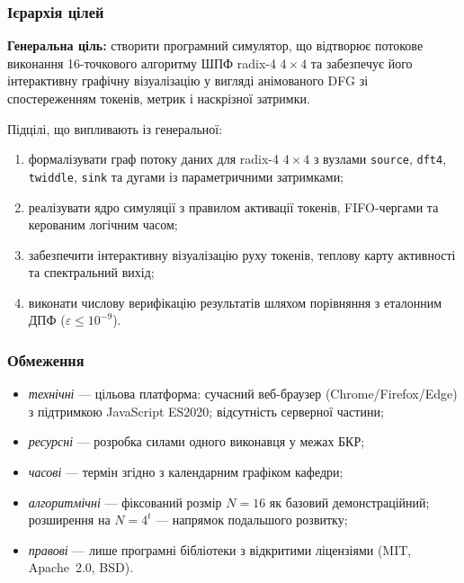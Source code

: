 \documentclass[14pt,a4paper]{extarticle}
\begin{document}
\subsubsection*{Ієрархія цілей}

\textbf{Генеральна ціль:} створити програмний симулятор, що відтворює
потокове виконання 16-точкового алгоритму ШПФ radix-4 $4\times4$ та
забезпечує його інтерактивну графічну візуалізацію у вигляді
анімованого DFG зі спостереженням токенів, метрик і наскрізної
затримки.

Підцілі, що випливають із генеральної:
\begin{enumerate}
  \item формалізувати граф потоку даних для radix-4 $4\times4$ з
        вузлами \texttt{source}, \texttt{dft4}, \texttt{twiddle},
        \texttt{sink} та дугами із параметричними затримками;
  \item реалізувати ядро симуляції з правилом активації токенів,
        FIFO-чергами та керованим логічним часом;
  \item забезпечити інтерактивну візуалізацію руху токенів,
        теплову карту активності та спектральний вихід;
  \item виконати числову верифікацію результатів шляхом порівняння
        з еталонним ДПФ ($\varepsilon \le 10^{-9}$).
\end{enumerate}

\subsubsection*{Обмеження}

\begin{itemize}
  \item \textit{технічні} --- цільова платформа: сучасний веб-браузер
        (Chrome/Firefox/Edge) з підтримкою JavaScript ES2020;
        відсутність серверної частини;
  \item \textit{ресурсні} --- розробка силами одного виконавця у
        межах БКР;
  \item \textit{часові} --- термін згідно з календарним графіком
        кафедри;
  \item \textit{алгоритмічні} --- фіксований розмір $N = 16$ як
        базовий демонстраційний; розширення на $N = 4^t$ ---
        напрямок подальшого розвитку;
  \item \textit{правові} --- лише програмні бібліотеки з відкритими
        ліцензіями (MIT, Apache~2.0, BSD).
\end{itemize}
\end{document}
